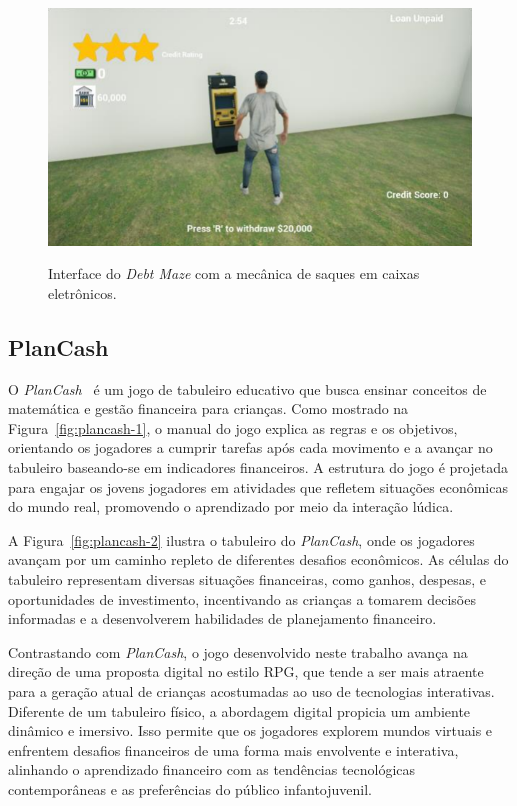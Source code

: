 \begin{figure}[ht]
	\centering
	\caption{Interface do \textit{Debt Maze} com a mecânica de saques em caixas eletrônicos.}
	\includegraphics[scale=0.8]{Textuais/Pictures/debt-maze-2.png}
	\label{fig:debt-maze-2}
\end{figure}

\newpage

\subsection{PlanCash}
\label{subsec:plancash}

O \textit{PlanCash}~\cite{mariano2020educaccao} é um jogo de tabuleiro educativo que busca ensinar conceitos de matemática e gestão financeira para crianças. Como mostrado na Figura~\ref{fig:plancash-1}, o manual do jogo explica as regras e os objetivos, orientando os jogadores a cumprir tarefas após cada movimento e a avançar no tabuleiro baseando-se em indicadores financeiros. A estrutura do jogo é projetada para engajar os jovens jogadores em atividades que refletem situações econômicas do mundo real, promovendo o aprendizado por meio da interação lúdica.

A Figura~\ref{fig:plancash-2} ilustra o tabuleiro do \textit{PlanCash}, onde os jogadores avançam por um caminho repleto de diferentes desafios econômicos. As células do tabuleiro representam diversas situações financeiras, como ganhos, despesas, e oportunidades de investimento, incentivando as crianças a tomarem decisões informadas e a desenvolverem habilidades de planejamento financeiro.

Contrastando com \textit{PlanCash}, o jogo desenvolvido neste trabalho avança na direção de uma proposta digital no estilo RPG, que tende a ser mais atraente para a geração atual de crianças acostumadas ao uso de tecnologias interativas. Diferente de um tabuleiro físico, a abordagem digital propicia um ambiente dinâmico e imersivo. Isso permite que os jogadores explorem mundos virtuais e enfrentem desafios financeiros de uma forma mais envolvente e interativa, alinhando o aprendizado financeiro com as tendências tecnológicas contemporâneas e as preferências do público infantojuvenil.

